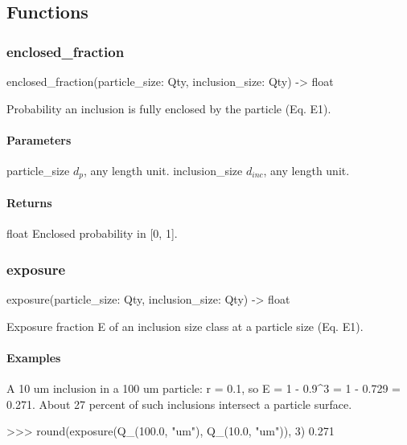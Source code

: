 \documentclass[10pt,a4paper,twoside]{report}
\begin{document}
\subsection*{Functions}

\subsubsection*{enclosed\_fraction}

\begin{verbatimsmall}
enclosed_fraction(particle_size: Qty, inclusion_size: Qty) -> float
\end{verbatimsmall}

Probability an inclusion is fully enclosed by the particle (Eq. E1).

\paragraph*{Parameters}

particle\_size $d_p$, any length unit. inclusion\_size $d_{inc}$, any length unit.

\paragraph*{Returns}

float Enclosed probability in [0, 1].

\subsubsection*{exposure}

\begin{verbatimsmall}
exposure(particle_size: Qty, inclusion_size: Qty) -> float
\end{verbatimsmall}

Exposure fraction E of an inclusion size class at a particle size (Eq. E1).

\paragraph*{Examples}

A 10 um inclusion in a 100 um particle: r = 0.1, so E = 1 - 0.9\textasciicircum{}3 = 1 - 0.729 = 0.271. About 27 percent of such inclusions intersect a particle surface.

\begin{doctestblock}
>>> round(exposure(Q_(100.0, "um"), Q_(10.0, "um")), 3)
0.271
\end{doctestblock}
\end{document}
